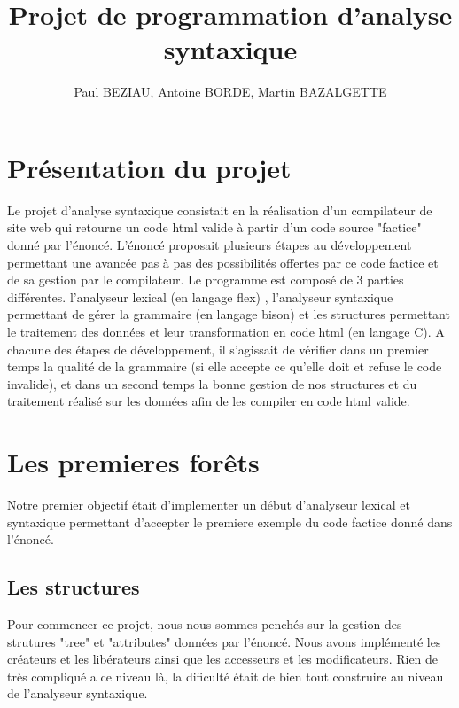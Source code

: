 \documentclass[12pt]{article}
\begin{document}
\title{Projet de programmation d'analyse syntaxique}
\author{Paul BEZIAU, Antoine BORDE, Martin BAZALGETTE}

\maketitle
\newpage
\tableofcontents
\newpage


\section{Présentation du projet}
Le projet d'analyse syntaxique consistait en la réalisation d'un compilateur
de site web qui retourne un code html valide à partir d'un code source "factice"
donné par l'énoncé.
\newline
L'énoncé proposait plusieurs étapes au développement permettant une avancée
pas à pas des possibilités offertes par ce code factice et de sa gestion
par le compilateur.
\newline
Le programme est composé de 3 parties différentes. l'analyseur lexical (en langage flex) ,
l'analyseur syntaxique permettant de gérer la grammaire (en langage bison) et les structures
permettant le traitement des données et leur transformation en code html (en langage C).
\newline
A chacune des étapes de développement, il s'agissait de vérifier dans un premier
temps la qualité de la grammaire (si elle accepte ce qu'elle doit et refuse
le code invalide), et dans un second temps la bonne gestion de nos structures
et du traitement réalisé sur les données afin de les compiler en code html valide.

\newpage

\section{Les premieres forêts}

Notre premier objectif était d'implementer un début d'analyseur lexical et syntaxique
permettant d'accepter le premiere exemple du code factice donné dans l'énoncé.

\subsection{Les structures}

Pour commencer ce projet, nous nous sommes penchés sur la gestion des strutures
"tree" et "attributes" données par l'énoncé. Nous avons implémenté les créateurs et les
libérateurs ainsi que les accesseurs et les modificateurs. Rien de très compliqué a ce niveau
là, la dificulté était de bien tout construire au niveau de l'analyseur syntaxique.
\end{document}
